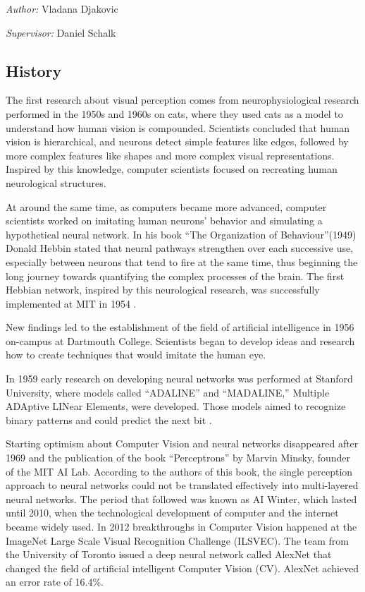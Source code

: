 \documentclass[
]{krantz}
\begin{document}
\emph{Author: } Vladana Djakovic

\emph{Supervisor:} Daniel Schalk

\hypertarget{history}{%
\subsection{History}\label{history}}

The first research about visual perception comes from neurophysiological research performed in the 1950s and 1960s on cats, where they used cats as a model to understand how human vision is compounded. Scientists concluded that human vision is hierarchical, and neurons detect simple features like edges, followed by more complex features like shapes and more complex visual representations. Inspired by this knowledge, computer scientists focused on recreating human neurological structures.

At around the same time, as computers became more advanced, computer scientists worked on imitating human neurons' behavior and simulating a hypothetical neural network. In his book ``The Organization of Behaviour''(1949) Donald Hebbin stated that neural pathways strengthen over each successive use, especially between neurons that tend to fire at the same time, thus beginning the long journey towards quantifying the complex processes of the brain. The first Hebbian network, inspired by this neurological research, was successfully implemented at MIT in 1954 \citet{history1}.

New findings led to the establishment of the field of artificial intelligence in 1956 on-campus at Dartmouth College. Scientists began to develop ideas and research how to create techniques that would imitate the human eye.

In 1959 early research on developing neural networks was performed at Stanford University, where models called ``ADALINE'' and ``MADALINE,'' Multiple ADAptive LINear Elements, were developed. Those models aimed to recognize binary patterns and could predict the next bit \citet{history2}.

Starting optimism about Computer Vision and neural networks disappeared after 1969 and the publication of the book ``Perceptrons'' by Marvin Minsky, founder of the MIT AI Lab. According to the authors of this book, the single perception approach to neural networks could not be translated effectively into multi-layered neural networks. The period that followed was known as AI Winter, which lasted until 2010, when the technological development of computer and the internet became widely used. In 2012 breakthroughs in Computer Vision happened at the ImageNet Large Scale Visual Recognition Challenge (ILSVEC). The team from the University of Toronto issued a deep neural network called AlexNet \citet{alexnet} that changed the field of artificial intelligent Computer Vision (CV). AlexNet achieved an error rate of 16.4\%.
\end{document}
